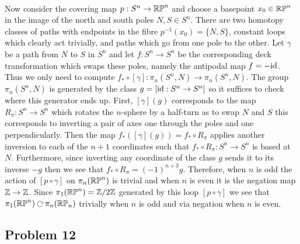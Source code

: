 \documentclass[12pt]{extarticle}
\begin{document}
\bigskip\\
Now consider the covering map $p : S^n \to \mathbb{RP}^n$ and choose a basepoint $x_0 \in \mathbb{RP}^n$ in the image of the north and south poles $N,S \in S^n$. There are two homotopy classes of paths with endpoints in the fibre $p^{-1}(x_0) = \{ N, S \}$, constant loops which clearly act trivially, and paths which go from one pole to the other. Let $\gamma$ be a path from $N$ to $S$ in $S^n$ and let $f : S^n \to S^n$ be the corresponding deck transformation which swaps these poles, namely the antipodal map $f = - \mathrm{id}$. Thus we only need to compute $f_* \circ [\gamma] : \pi_n(S^n, N) \to \pi_n(S^n, N)$. The group $\pi_n(S^n, N)$ is generated by the class $g = [ \mathrm{id} : S^n \to S^n ]$ so it suffices to check where this generator ends up. First, $[\gamma](g)$ corresponds to the map $R_\pi : S^n \to S^n$ which rotates the $n$-sphere by a half-turn as to swap $N$ and $S$ this corresponds to inverting a pair of axes one through the poles and one perpendicularly. Then the map $f_*([\gamma](g)) = f_* \circ R_\pi$ applies another inversion to each of the $n+1$ coordinates such that $f_* \circ R_\pi : S^n \to S^n$ is based at $N$. Furthermore, since inverting any coordinate of the class $g$ sends it to its inverse $-g$ then we see that $f_* \circ R_\pi = (-1)^{n + 3} g$. Therefore, when $n$ is odd the action of $[p \circ \gamma]$ on $\pi_n(\mathbb{RP}^n)$ is trivial and when $n$ is even it is the negation map $\mathbb{Z} \to \mathbb{Z}$. Since $\pi_1(\mathbb{RP}^n) = \mathbb{Z} / 2 \mathbb{Z}$ generated by this loop $[p \circ \gamma]$ we see that $\pi_1(\RP^n) \acts \pi_n(\RP_n)$ trivially when $n$ is odd and via negation when $n$ is even. 

\subsection{Problem 12} 
\end{document}
